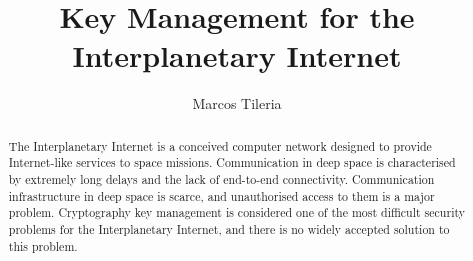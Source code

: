 \documentclass[11pt]{article} %
\title{Key Management for the Interplanetary Internet}
\author{Marcos Tileria}
\theoremstyle{plain}
\theoremstyle{definition}
\begin{document}
\maketitle

\declaration

\begin{abstract}
  
 The Interplanetary Internet is a conceived computer network designed to provide Internet-like services to space missions. Communication in deep space is characterised by extremely long delays and the lack of end-to-end connectivity. Communication infrastructure in deep space is scarce, and unauthorised access to them is a major problem. Cryptography key management is considered one of the most difficult security problems for the Interplanetary Internet, and there is no widely accepted solution to this problem. 
  
\end{abstract}


 \newpage


 \newpage


\newpage


 \newpage


 \newpage


 \newpage




\end{document}
